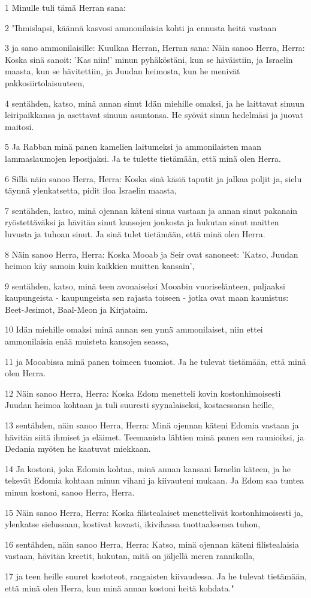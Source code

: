 \par 1 Minulle tuli tämä Herran sana:
\par 2 "Ihmislapsi, käännä kasvosi ammonilaisia kohti ja ennusta heitä vastaan
\par 3 ja sano ammonilaisille: Kuulkaa Herran, Herran sana: Näin sanoo Herra, Herra: Koska sinä sanoit: 'Kas niin!' minun pyhäköstäni, kun se häväistiin, ja Israelin maasta, kun se hävitettiin, ja Juudan heimosta, kun he menivät pakkosiirtolaisuuteen,
\par 4 sentähden, katso, minä annan sinut Idän miehille omaksi, ja he laittavat sinuun leiripaikkansa ja asettavat sinuun asuntonsa. He syövät sinun hedelmäsi ja juovat maitosi.
\par 5 Ja Rabban minä panen kamelien laitumeksi ja ammonilaisten maan lammaslaumojen leposijaksi. Ja te tulette tietämään, että minä olen Herra.
\par 6 Sillä näin sanoo Herra, Herra: Koska sinä käsiä taputit ja jalkaa poljit ja, sielu täynnä ylenkatsetta, pidit iloa Israelin maasta,
\par 7 sentähden, katso, minä ojennan käteni sinua vastaan ja annan sinut pakanain ryöstettäväksi ja hävitän sinut kansojen joukosta ja hukutan sinut maitten luvusta ja tuhoan sinut. Ja sinä tulet tietämään, että minä olen Herra.
\par 8 Näin sanoo Herra, Herra: Koska Mooab ja Seir ovat sanoneet: 'Katso, Juudan heimon käy samoin kuin kaikkien muitten kansain',
\par 9 sentähden, katso, minä teen avonaiseksi Mooabin vuoriselänteen, paljaaksi kaupungeista - kaupungeista sen rajasta toiseen - jotka ovat maan kaunistus: Beet-Jesimot, Baal-Meon ja Kirjataim.
\par 10 Idän miehille omaksi minä annan sen ynnä ammonilaiset, niin ettei ammonilaisia enää muisteta kansojen seassa,
\par 11 ja Mooabissa minä panen toimeen tuomiot. Ja he tulevat tietämään, että minä olen Herra.
\par 12 Näin sanoo Herra, Herra: Koska Edom menetteli kovin kostonhimoisesti Juudan heimoa kohtaan ja tuli suuresti syynalaiseksi, kostaessansa heille,
\par 13 sentähden, näin sanoo Herra, Herra: Minä ojennan käteni Edomia vastaan ja hävitän siitä ihmiset ja eläimet. Teemanista lähtien minä panen sen raunioiksi, ja Dedania myöten he kaatuvat miekkaan.
\par 14 Ja kostoni, joka Edomia kohtaa, minä annan kansani Israelin käteen, ja he tekevät Edomia kohtaan minun vihani ja kiivauteni mukaan. Ja Edom saa tuntea minun kostoni, sanoo Herra, Herra.
\par 15 Näin sanoo Herra, Herra: Koska filistealaiset menettelivät kostonhimoisesti ja, ylenkatse sielussaan, kostivat kovasti, ikivihassa tuottaaksensa tuhon,
\par 16 sentähden, näin sanoo Herra, Herra: Katso, minä ojennan käteni filistealaisia vastaan, hävitän kreetit, hukutan, mitä on jäljellä meren rannikolla,
\par 17 ja teen heille suuret kostoteot, rangaisten kiivaudessa. Ja he tulevat tietämään, että minä olen Herra, kun minä annan kostoni heitä kohdata."

